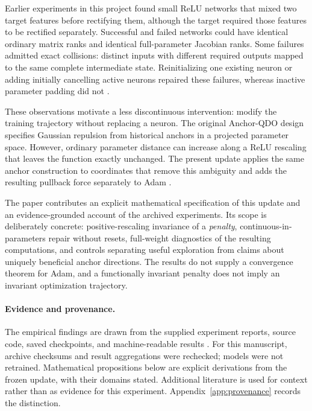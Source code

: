 \documentclass[11pt,letterpaper]{article}
\theoremstyle{remark}\newtheorem{remark}{Remark}
\begin{document}
Earlier experiments in this project found small ReLU networks that mixed two target features before rectifying them, although the target required those features to be rectified separately. Successful and failed networks could have identical ordinary matrix ranks and identical full-parameter Jacobian ranks. Some failures admitted exact collisions: distinct inputs with different required outputs mapped to the same complete intermediate state. Reinitializing one existing neuron or adding initially cancelling active neurons repaired these failures, whereas inactive parameter padding did not \cite{artifactAnatomy,artifactProjection}.

These observations motivate a less discontinuous intervention: modify the training trajectory without replacing a neuron. The original Anchor-QDO design specifies Gaussian repulsion from historical anchors in a projected parameter space. However, ordinary parameter distance can increase along a ReLU rescaling that leaves the function exactly unchanged. The present update applies the same anchor construction to coordinates that remove this ambiguity and adds the resulting pullback force separately to Adam \cite{adam,artifactQdo}.

The paper contributes an explicit mathematical specification of this update and an evidence-grounded account of the archived experiments. Its scope is deliberately concrete: positive-rescaling invariance of a \emph{penalty}, continuous-in-parameters repair without resets, full-weight diagnostics of the resulting computations, and controls separating useful exploration from claims about uniquely beneficial anchor directions. The results do not supply a convergence theorem for Adam, and a functionally invariant penalty does not imply an invariant optimization trajectory.

\paragraph{Evidence and provenance.}
The empirical findings are drawn from the supplied experiment reports, source code, saved checkpoints, and machine-readable results \cite{artifactQdo,artifactAnatomy,artifactDirectional,artifactProjection}. For this manuscript, archive checksums and result aggregations were rechecked; models were not retrained. Mathematical propositions below are explicit derivations from the frozen update, with their domains stated. Additional literature is used for context rather than as evidence for this experiment. Appendix~\ref{app:provenance} records the distinction.
\end{document}
